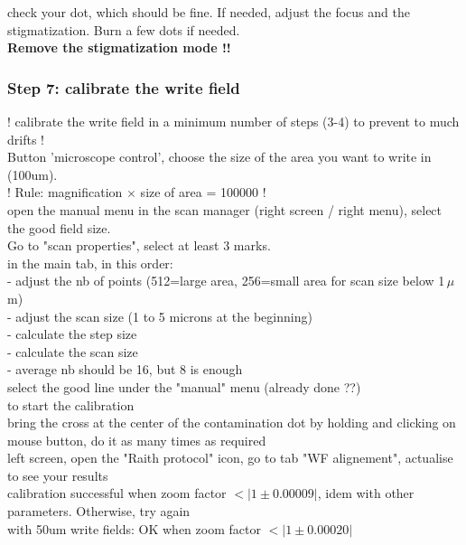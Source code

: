 \documentclass[12pt,a4paper]{report}
\begin{document}
\begin{enumerate}
check your dot, which should be fine. If needed, adjust the focus and the stigmatization. Burn a few dots if needed.\\

\textbf{Remove the stigmatization mode !!}\\


\subsubsection{Step 7: calibrate the write field}

! calibrate the write field in a minimum number of steps (3-4) to prevent to much drifts !\\

Button 'microscope control', choose the size of the area you want to write in (100um).\\
! Rule: magnification $\times$ size of area = 100000 !\\

open the manual menu in the scan manager (right screen / right menu), select the good field size.\\

Go to "scan properties", select at least 3 marks.\\

in the main tab, in this order:\\
- adjust the nb of points (512=large area, 256=small area for scan size below 1\,$\mu$m)\\
- adjust the scan size (1 to 5 microns at the beginning)\\
- calculate the step size\\
- calculate the scan size\\
- average nb should be 16, but 8 is enough\\

select the good line under the "manual" menu (already done ??)\\

 to start the calibration\\

bring the cross at the center of the contamination dot by holding  and clicking on mouse button, do it as many times as required\\

left screen, open the "Raith protocol" icon, go to tab "WF alignement", actualise to see your results\\

calibration successful when zoom factor $<|1\pm0.00009|$, idem with other parameters. Otherwise, try again\\
with 50um write fields: OK when zoom factor $<|1\pm0.00020|$


\end{enumerate}
\end{document}
